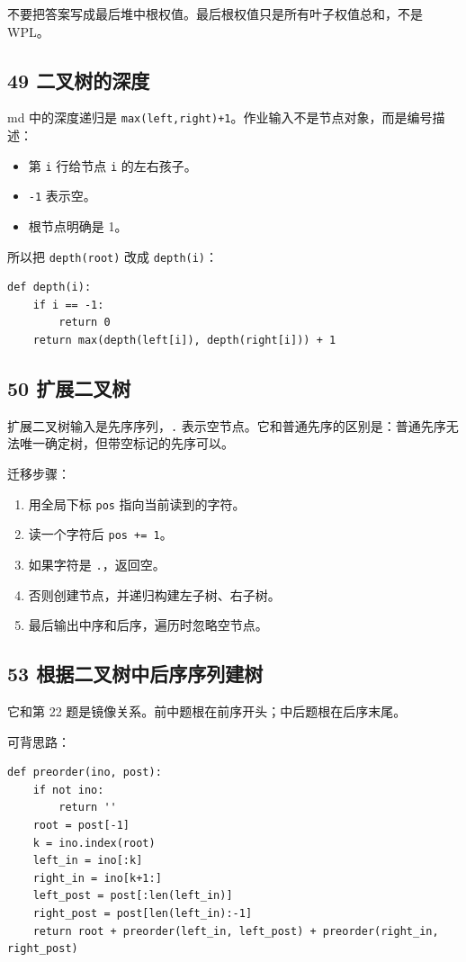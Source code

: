 \documentclass[10pt,a4paper,fontset=none]{ctexart}
\begin{document}
不要把答案写成最后堆中根权值。最后根权值只是所有叶子权值总和，不是 WPL。

\subsection{49 二叉树的深度}
md 中的深度递归是 \texttt{max(left,right)+1}。作业输入不是节点对象，而是编号描述：
\begin{itemize}
  \item 第 \texttt{i} 行给节点 \texttt{i} 的左右孩子。
  \item \texttt{-1} 表示空。
  \item 根节点明确是 1。
\end{itemize}

所以把 \texttt{depth(root)} 改成 \texttt{depth(i)}：
\begin{lstlisting}[style=py]
def depth(i):
    if i == -1:
        return 0
    return max(depth(left[i]), depth(right[i])) + 1
\end{lstlisting}

\subsection{50 扩展二叉树}
扩展二叉树输入是先序序列，\texttt{.} 表示空节点。它和普通先序的区别是：普通先序无法唯一确定树，但带空标记的先序可以。

迁移步骤：
\begin{enumerate}
  \item 用全局下标 \texttt{pos} 指向当前读到的字符。
  \item 读一个字符后 \texttt{pos += 1}。
  \item 如果字符是 \texttt{.}，返回空。
  \item 否则创建节点，并递归构建左子树、右子树。
  \item 最后输出中序和后序，遍历时忽略空节点。
\end{enumerate}

\subsection{53 根据二叉树中后序序列建树}
它和第 22 题是镜像关系。前中题根在前序开头；中后题根在后序末尾。

可背思路：
\begin{lstlisting}[style=py]
def preorder(ino, post):
    if not ino:
        return ''
    root = post[-1]
    k = ino.index(root)
    left_in = ino[:k]
    right_in = ino[k+1:]
    left_post = post[:len(left_in)]
    right_post = post[len(left_in):-1]
    return root + preorder(left_in, left_post) + preorder(right_in, right_post)
\end{lstlisting}
\end{document}

